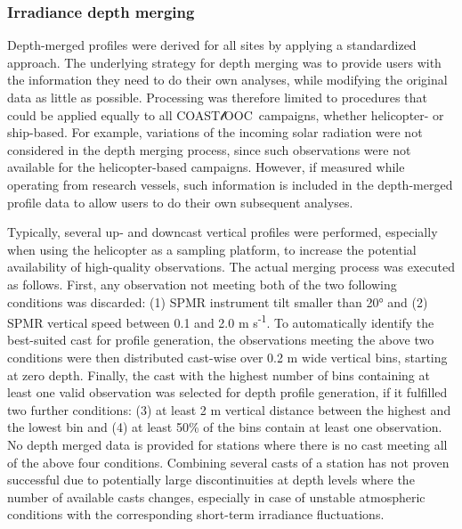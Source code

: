 \documentclass[essd, manuscript]{copernicus}
\newcommand{\coastlooc}{COAST$\mathscr{l}$OOC~\allowbreak}
\begin{document}
\subsubsection{Irradiance depth merging}

Depth-merged profiles were derived for all sites by applying a standardized approach. The underlying strategy for depth merging was to provide users with the information they need to do their own analyses, while modifying the original data as little as possible. Processing was therefore limited to procedures that could be applied equally to all \coastlooc campaigns, whether helicopter- or ship-based. For example, variations of the incoming solar radiation were not considered in the depth merging process, since such observations were not available for the helicopter-based campaigns. However, if measured while operating from research vessels, such information is included in the depth-merged profile data to allow users to do their own subsequent analyses.

Typically, several up- and downcast vertical profiles were performed, especially when using the helicopter as a sampling platform, to increase the potential availability of high-quality observations. The actual merging process was executed as follows. First, any observation not meeting both of the two following conditions was discarded: (1) SPMR instrument tilt smaller than 20° and (2) SPMR vertical speed between 0.1 and 2.0 m s\textsuperscript{-1}. To automatically identify the best-suited cast for profile generation, the observations meeting the above two conditions were then distributed cast-wise over 0.2 m wide vertical bins, starting at zero depth. Finally, the cast with the highest number of bins containing at least one valid observation was selected for depth profile generation, if it fulfilled two further conditions: (3) at least 2 m vertical distance between the highest and the lowest bin and (4) at least 50\% of the bins contain at least one observation. No depth merged data is provided for stations where there is no cast meeting all of the above four conditions. Combining several casts of a station has not proven successful due to potentially large discontinuities at depth levels where the number of available casts changes, especially in case of unstable atmospheric conditions with the corresponding short-term irradiance fluctuations.
\end{document}
